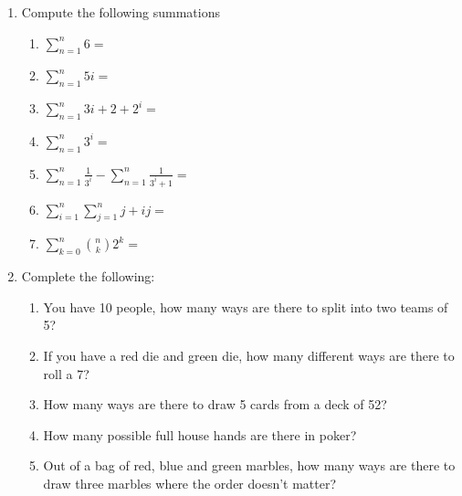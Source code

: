 \documentclass[basic, header]{nosvagor-notes}
\begin{document}
\begin{enumerate}

  \item Compute the following summations
    \begin{enumerate}

      \item \(\displaystyle \sum_{n=1}^{n} 6 = \)

      \item \(\displaystyle \sum_{n=1}^{n} 5i = \)

      \item \(\displaystyle \sum_{n=1}^{n} 3i + 2 + 2^i = \)

      \item \(\displaystyle \sum_{n=1}^{n} 3^i = \)

      \item \(\displaystyle \sum_{n=1}^{n} \frac{1}{3^i} - \sum_{n=1}^{n} \frac{1}{3^i + 1}= \)

      \item \(\displaystyle \sum_{i=1}^{n} \sum_{j=1}^{n} j + ij = \)

      \item \(\displaystyle \sum_{k=0}^{n} {n \choose k} 2^k  = \)
    \end{enumerate}

  \newpage %

  \item Complete the following:

    \begin{enumerate}

      \item You have 10 people, how many ways are there to split into two teams of 5?

      \item If you have a red die and green die, how many different ways are there to roll a 7?

      \item How many ways are there to draw 5 cards from a deck of 52?

      \item How many possible full house hands are there in poker?

      \item Out of a bag of red, blue and green marbles, how many ways are
        there to draw three marbles where the order doesn't matter?

    \end{enumerate}


\end{enumerate}
\end{document}
